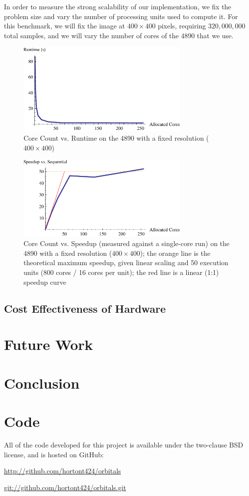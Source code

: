 \documentclass{acmsiggraph}
\begin{document}
In order to measure the strong scalability of our implementation, we fix the problem size and vary the number of processing units used to compute it. For this benchmark, we will fix the image at $400\times400$ pixels, requiring $320,000,000$ total samples, and we will vary the number of cores of the 4890 that we use.

\begin{figure}
    \includegraphics[width=84.5mm]{strongPlotOne.pdf}
    \caption{Core Count vs. Runtime on the 4890 with a fixed resolution ($400\times400$)}
\end{figure}

\begin{figure}
    \includegraphics[width=84.5mm]{strongPlotTwo.pdf}
    \caption{Core Count vs. Speedup (measured against a single-core run) on the 4890 with a fixed resolution ($400\times400$); the orange line is the theoretical maximum speedup, given linear scaling and 50 execution units (800 cores / 16 cores per unit); the red line is a linear (1:1) speedup curve}
\end{figure}

\subsection{Cost Effectiveness of Hardware}

\section{Future Work}

\section{Conclusion}

\section{Code}

All of the code developed for this project is available under the two-clause BSD license, and is hosted on GitHub:

\url{http://github.com/hortont424/orbitals}

\url{git://github.com/hortont424/orbitals.git}


\nocite{*}

\end{document}

